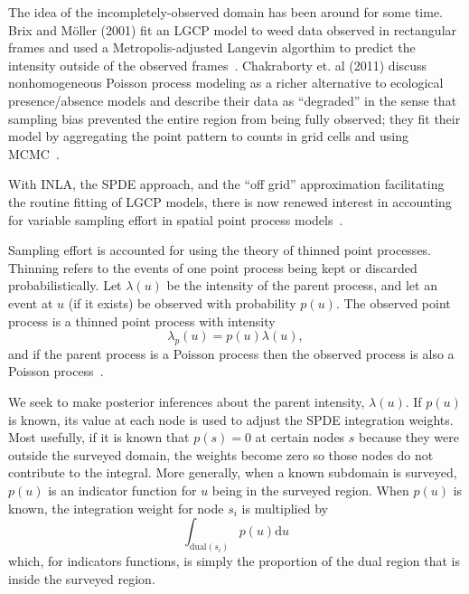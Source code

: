 \documentclass[]{interact}
\begin{document}
The idea of the incompletely-observed domain has been around for some time.
Brix and M\"{o}ller (2001) fit an LGCP model to weed data observed in
rectangular frames and used a Metropolis-adjusted Langevin algorthim
to predict the intensity outside of the observed frames~\cite{brixmoeller}.
Chakraborty et. al (2011) discuss nonhomogeneous Poisson process modeling as
a richer alternative to ecological presence/absence models and describe their
data as ``degraded'' in the sense that sampling bias prevented the entire
region from being fully observed; they fit their model by aggregating the
point pattern to counts in grid cells and using MCMC~\cite{chakrabortyetal}.

With INLA, the SPDE approach, and the ``off grid'' approximation
facilitating the routine fitting of LGCP models, there is now renewed interest
in accounting for variable sampling effort in spatial point process
models~\cite{simpsonetal,yuanetal}.

Sampling effort is accounted for using the theory of thinned point processes.
Thinning refers to the events of one point process being kept or discarded
probabilistically. Let \(\lambda(u)\) be the intensity of the parent process,
and let an event at \(u\) (if it exists) be observed with probability
\(p(u)\). The observed point process is a thinned point process with
intensity
\begin{displaymath}
\lambda_{p}(u) = p(u) \lambda(u),
\end{displaymath}
and if the parent process is a Poisson process then the observed process is
also a Poisson process~\cite{moellerwaagepetersen}.

We seek to make posterior inferences about the parent intensity,
\(\lambda(u)\). If \(p(u)\) is known, its value at each node is used to
adjust the SPDE integration weights. Most usefully, if it is known that
\(p(s) = 0\) at certain nodes \(s\) because they were outside the surveyed
domain, the weights become zero so those nodes do not contribute to the
integral. More generally, when a known subdomain is surveyed, \(p(u)\) is
an indicator function for \(u\) being in the surveyed region. When \(p(u)\)
is known, the integration weight for node \(s_{i}\) is multiplied by
\begin{displaymath}
\int_{\mathrm{dual}(s_{i})} p(u) \mathrm{d}u
\end{displaymath}
which, for indicators functions, is simply the proportion of the dual region
that is inside the surveyed region.
\end{document}
